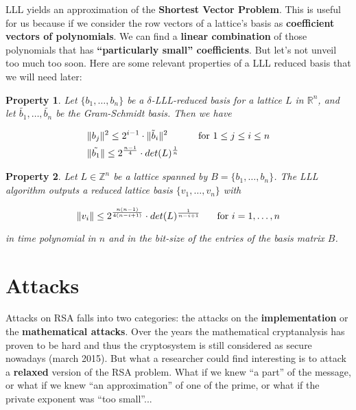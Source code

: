 \documentclass[a4paper,11pt]{article}
\newtheorem{property}{Property}
\begin{document}
LLL yields an approximation of the \textbf{Shortest Vector Problem}. This is useful for us because if we consider the row vectors of a lattice's basis as \textbf{coefficient vectors of polynomials}. We can find a \textbf{linear combination} of those polynomials that has \textbf{``particularly small'' coefficients}. But let's not unveil too much too soon. Here are some relevant properties of a LLL reduced basis that we will need later:


\begin{property}
Let $\{b_1,\hdots,b_n\}$ be a $\delta$-LLL-reduced basis for a lattice $L$ in $\mathbb{R}^n$, and let $\tilde{b_1},\hdots,\tilde{b_n}$ be the Gram-Schmidt basis. Then we have

\begin{align*}
 &\|b_j\|^2 \leq 2^{i-1} \cdot \|\tilde{b}_i\|^2 \hspace{10mm}\text{ for } 1 \leq j \leq i \leq n \\
 &\|\tilde{b_1}\| \leq 2^{\frac{n-1}{4}} \cdot det(L)^{\frac{1}{n}} 
\end{align*}
\end{property}

\begin{property}
Let $L \in \mathbb{Z}^n$ be a lattice spanned by $B = \{b_1, \hdots, b_n\}$. The LLL algorithm outputs a reduced lattice basis $\{v_1,\hdots,v_n\}$ with

\[ \|v_i\| \leq 2^{\frac{n(n-1)}{4(n-i+1)}} \cdot det(L)^{\frac{1}{n-i+1}} \hspace{5mm} \text{ for } i = 1,\hdots,n\]

in time polynomial in $n$ and in the bit-size of the entries of the basis matrix $B$.
\end{property}


\section{Attacks}\label{attacks}

Attacks on RSA falls into two categories: the attacks on the \textbf{implementation} or the \textbf{mathematical attacks}. Over the years the mathematical cryptanalysis has proven to be hard and thus the cryptosystem is still considered as secure nowadays (march 2015). But what a researcher could find interesting is to attack a \textbf{relaxed} version of the RSA problem. What if we knew ``a part'' of the message, or what if we knew ``an approximation'' of one of the prime, or what if the private exponent was ``too small''...
\end{document}
